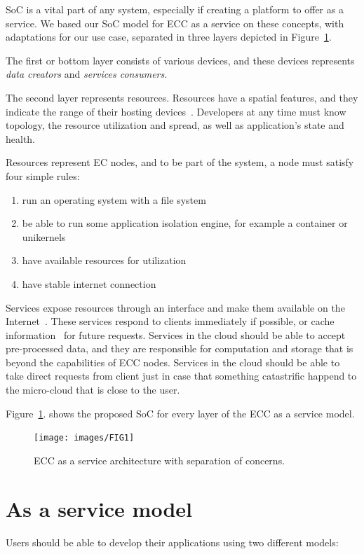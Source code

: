 SoC is a vital part of any system, especially if creating a platform to offer as a service. We based our SoC model for ECC as a service on these concepts, with adaptations for our use case, separated in three layers depicted in Figure~\ref{fig:fig10}. 

The first or bottom layer consists of various devices, and these devices represents \textit{data creators} and \textit{services consumers}. 

The second layer represents resources. Resources have a spatial features, and they indicate the range of their hosting devices~\cite{JinCJL14}. Developers at any time must know topology, the resource utilization and spread, as well as application's state and health.~\label{soc:resources}

Resources represent EC nodes, and to be part of the system, a node must satisfy four simple rules:

\begin{enumerate}[start=1,label={(\bfseries \arabic*)}]
\item run an operating system with a file system 
\item be able to run some application isolation engine, for example a container or unikernels 
\item have available resources for utilization 
\item have stable internet connection
\end{enumerate}

Services expose resources through an interface and make them available on the Internet~\cite{JinCJL14}. These services respond to clients immediately if possible, or cache information~\cite{SatyanarayananBCD09,YaoXWYZP20} for future requests. Services in the cloud should be able to accept pre-processed data, and they are responsible for computation and storage that is beyond the capabilities of ECC nodes. Services in the cloud should be able to take direct requests from client just in case that something catastrific happend to the micro-cloud that is close to the user.

Figure~\ref{fig:fig10}. shows the proposed SoC for every layer of the ECC as a service model.

\begin{figure}[H]
	\texttt{[image: images/FIG1]}
	\vspace{-0.7cm}
	\caption{ECC as a service architecture with separation of concerns.}
	\label{fig:fig10}
\end{figure}
%
%
\section{As a service model}\label{sec:as_a_service_model}
%
Users should be able to develop their applications using two different models:
 
